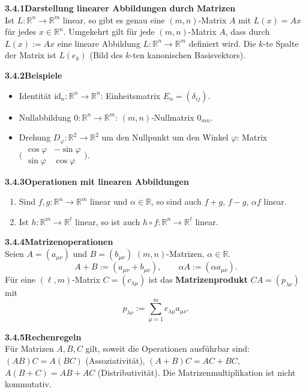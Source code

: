 \documentclass[a4paper,12pt]{article}
\newcommand{\gentry}[3]{%
  \noindent\textbf{#1\quad #2}\nopagebreak\\[0.2em]
  #3\par\smallskip
}
\begin{document}
\gentry{3.4.1}{Darstellung linearer Abbildungen durch Matrizen}{%
  Ist $L : \mathbb{R}^n \to \mathbb{R}^m$ linear, so gibt es genau eine $(m, n)$-Matrix
  $A$ mit $L(x) = Ax$ f\"ur jedes $x \in \mathbb{R}^n$. Umgekehrt gilt f\"ur jede
  $(m, n)$-Matrix $A$, dass durch $L(x) := Ax$ eine lineare Abbildung
  $L : \mathbb{R}^n \to \mathbb{R}^m$ definiert wird.
  Die $k$-te Spalte der Matrix ist $L(e_k)$ (Bild des $k$-ten kanonischen Basisvektors).
}

\gentry{3.4.2}{Beispiele}{%
  \begin{itemize}[topsep=2pt,itemsep=1pt]
    \item Identit\"at $\mathrm{id}_n : \mathbb{R}^n \to \mathbb{R}^n$: Einheitsmatrix
          $E_n = (\delta_{ij})$.
    \item Nullabbildung $0 : \mathbb{R}^n \to \mathbb{R}^m$: $(m, n)$-Nullmatrix $0_{mn}$.
    \item Drehung $D_\varphi : \mathbb{R}^2 \to \mathbb{R}^2$ um den Nullpunkt um den
          Winkel $\varphi$: Matrix $\bigl(\begin{smallmatrix} \cos \varphi & -\sin \varphi \\ \sin \varphi & \cos \varphi \end{smallmatrix}\bigr)$.
  \end{itemize}
}

\gentry{3.4.3}{Operationen mit linearen Abbildungen}{%
  \begin{enumerate}[label=(\roman*),topsep=2pt,itemsep=1pt]
    \item Sind $f, g : \mathbb{R}^n \to \mathbb{R}^m$ linear und $\alpha \in \mathbb{R}$,
          so sind auch $f + g$, $f - g$, $\alpha f$ linear.
    \item Ist $h : \mathbb{R}^m \to \mathbb{R}^\ell$ linear, so ist auch
          $h \circ f : \mathbb{R}^n \to \mathbb{R}^\ell$ linear.
  \end{enumerate}
}

\gentry{3.4.4}{Matrizenoperationen}{%
  Seien $A = (a_{\mu\nu})$ und $B = (b_{\mu\nu})$ $(m, n)$-Matrizen, $\alpha \in \mathbb{R}$.
  \[
    A + B := (a_{\mu\nu} + b_{\mu\nu}), \qquad
    \alpha A := (\alpha a_{\mu\nu}).
  \]
  F\"ur eine $(\ell, m)$-Matrix $C = (c_{\lambda\mu})$ ist das \textbf{Matrizenprodukt}
  $CA = (p_{\lambda\nu})$ mit
  \[
    p_{\lambda\nu} := \sum_{\mu=1}^m c_{\lambda\mu} a_{\mu\nu}.
  \]
}

\gentry{3.4.5}{Rechenregeln}{%
  F\"ur Matrizen $A, B, C$ gilt, soweit die Operationen ausf\"uhrbar sind:
  $(AB)C = A(BC)$ (Assoziativit\"at), $(A + B)C = AC + BC$, $A(B + C) = AB + AC$
  (Distributivit\"at). Die Matrizenmultiplikation ist nicht kommutativ.
}
\end{document}
